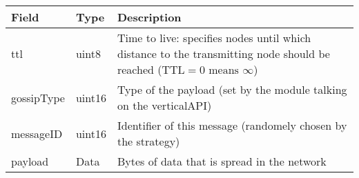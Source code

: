 \begin{tabularx}{.85\linewidth}{llX}
	\toprule
	Field & Type & Description
	\\
	\midrule
	ttl & uint8 & Time to live: specifies nodes until which distance to the transmitting node should be reached ($\text{TTL} = 0 \text{ means } \infty$)
	\\
	gossipType & uint16 & Type of the payload (set by the module talking on the verticalAPI)
	\\
	messageID & uint16 & Identifier of this message (randomely chosen by the strategy)
	\\
	payload & Data & Bytes of data that is spread in the network
	\\
	\bottomrule
\end{tabularx}
